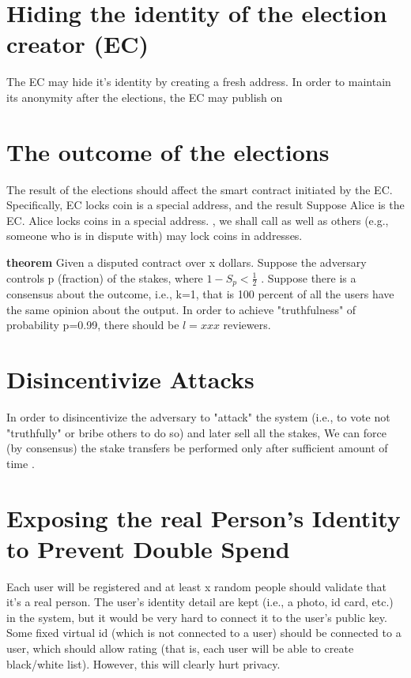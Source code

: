 \documentclass[]{article}
\begin{document}
\begin{itemize}
\section{Hiding the identity of the election creator (EC)}
The EC may hide it's identity by creating a fresh address. In order to maintain its anonymity after the elections, the EC may publish on

\section{The outcome of the elections}
The result of the elections should affect the smart contract initiated by the EC. Specifically, EC locks coin is a special address, and the result 
Suppose Alice is the EC. Alice locks coins in a special address. 
, we shall call as well as others (e.g., someone who is in dispute with) may lock coins in addresses.    




{\bf theorem}
	Given a disputed contract over x dollars. Suppose the adversary controls p (fraction) of the stakes, where $1-S_p<\frac{1}{2}$ . Suppose there is a consensus about the outcome, i.e., k=1, that is 100 percent of all the users have the same opinion about the output. In order to achieve "truthfulness" of probability p=0.99, there should be $l=xxx$ reviewers. 

\section{Disincentivize Attacks}
In order to disincentivize the adversary to "attack" the system (i.e., to vote not "truthfully" or bribe others to do so) and later sell all the stakes, 
We can force (by consensus) the stake transfers be performed only after sufficient amount of time . 

\section{Exposing the real Person's Identity to Prevent Double Spend}
Each user will be registered and at least x random people should validate that it's a real person. The user's identity detail are kept (i.e., a photo, id card, etc.) in the system, but it would be very hard to connect it to the user's public key. Some fixed virtual id (which is not connected to a user) should be connected to a user, which should allow rating (that is, each user will be able to create black/white list). However, this will clearly hurt privacy.



\end{itemize}
\end{document}
